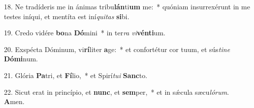 18. Ne tradíderis me in ánimas tribu\textbf{lán}ti\textbf{um} me:~*  quóniam insurrexérunt in me testes iníqui, et mentíta est iní\textit{qui}\textit{tas} \textbf{si}bi.\

19. Credo vidére \textbf{bo}na \textbf{Dó}mini~*  in ter\textit{ra} \textit{vi}\textbf{vén}\textbf{ti}um.\

20. Exspécta Dóminum, vi\textbf{rí}liter \textbf{a}ge:~*  et confortétur cor tuum, et sús\textit{ti}\textit{ne} \textbf{Dó}\textbf{mi}num.\

21. Glória \textbf{Pa}tri, et \textbf{Fí}lio,~*  et Spirí\textit{tu}\textit{i} \textbf{Sanc}to.\

22. Sicut erat in princípio, et \textbf{nunc}, et \textbf{sem}per,~*  et in sǽcula sæcu\textit{ló}\textit{rum}. \textbf{A}men.\

